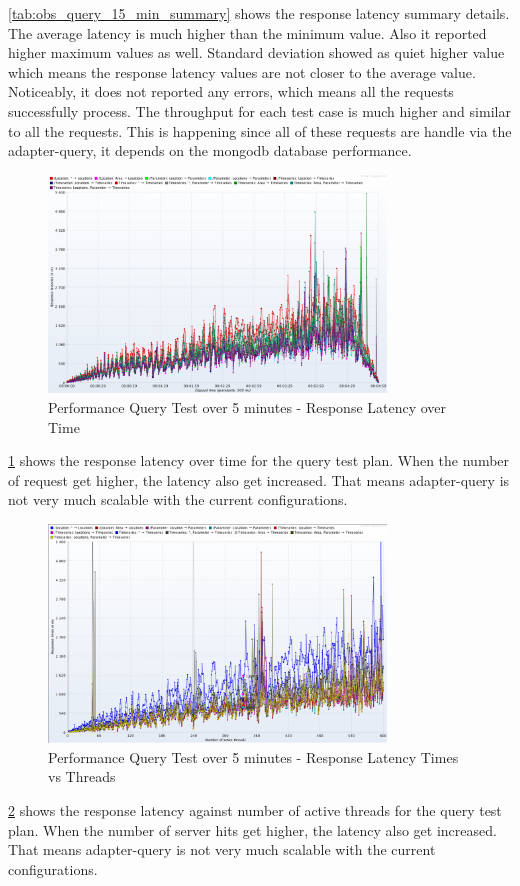 \ref{tab:obs_query_15_min_summary} shows the response latency summary details. The average latency is much higher than the minimum value. Also it reported higher maximum values as well. Standard deviation showed as quiet higher value which means the response latency values are not closer to the average value. Noticeably, it does not reported any errors, which means all the requests successfully process.
The throughput for each test case is much higher and similar to all the requests. This is happening since all of these requests are handle via the adapter-query, it depends on the \acrshort{mongodb} database performance.

\begin{figure}[htp]
    \centering
    \includegraphics[width=0.8\textwidth]{results/obs/query/obs_query_5m_latency_over_time.png}
    \caption{Performance Query Test over 5 minutes - Response Latency over Time}
    \label{fi:test_obs_query_5m_response_latency}
\end{figure}
\ref{fi:test_obs_query_5m_response_latency} shows the response latency over time for the query test plan. When the number of request get higher, the latency also get increased. That means adapter-query is not very much scalable with the current configurations.

\begin{figure}[htp]
    \centering
    \includegraphics[width=0.8\textwidth]{results/obs/query/obs_query_5m_response_times_vs_threads.png}
    \caption{Performance Query Test over 5 minutes - Response Latency Times vs Threads}
    \label{fi:test_obs_query_5m_response_times_vs_threads}
\end{figure}
\ref{fi:test_obs_query_5m_response_times_vs_threads} shows the response latency against number of active threads for the query test plan. When the number of server hits get higher, the latency also get increased. That means adapter-query is not very much scalable with the current configurations.

